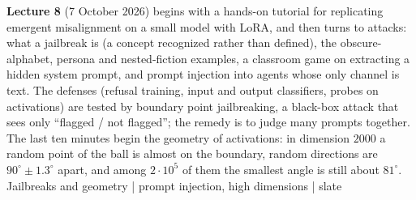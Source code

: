 \textbf{Lecture 8} (7 October 2026) begins with a hands-on tutorial for replicating emergent misalignment on a small model with LoRA, and then turns to attacks: what a jailbreak is (a concept recognized rather than defined), the obscure-alphabet, persona and nested-fiction examples, a classroom game on extracting a hidden system prompt, and prompt injection into agents whose only channel is text. The defenses (refusal training, input and output classifiers, probes on activations) are tested by boundary point jailbreaking, a black-box attack that sees only ``flagged / not flagged''; the remedy is to judge many prompts together. The last ten minutes begin the geometry of activations: in dimension $2000$ a random point of the ball is almost on the boundary, random directions are $90^\circ\pm1.3^\circ$ apart, and among $2\cdot10^5$ of them the smallest angle is still about $81^\circ$.
Jailbreaks and geometry | prompt injection, high dimensions | slate
